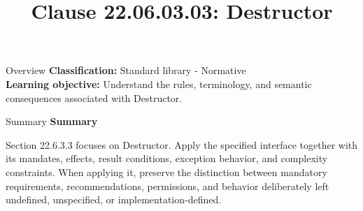 \documentclass[10pt,letterpaper]{article}
\title{Clause 22.06.03.03: Destructor}
\author{}
\date{}
\begin{document}
\maketitle
\begin{CornellOverviewBox}{Overview}
\textbf{Classification:} Standard library - Normative\\[2pt]
\textbf{Learning objective:} Understand the rules, terminology, and semantic consequences associated with Destructor.
\end{CornellOverviewBox}\begin{CornellSummaryBox}{Summary}
{\sffamily\bfseries\color{Accent} Summary}\par\vspace{3pt}Section 22.6.3.3 focuses on Destructor. Apply the specified interface together with its mandates, effects, result conditions, exception behavior, and complexity constraints. When applying it, preserve the distinction between mandatory requirements, recommendations, permissions, and behavior deliberately left undefined, unspecified, or implementation-defined.
\end{CornellSummaryBox}
\end{document}
